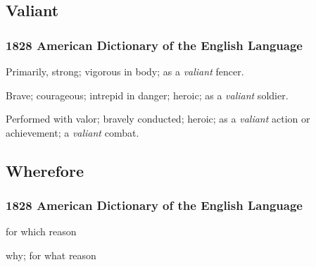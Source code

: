 
	\subsection{Valiant} %
		\label{VALIANT}
		
		\subsubsection{1828 American Dictionary of the English Language}
		
			\begin{compactitem}
				\item[1] Primarily, strong; vigorous in body; as a \textit{valiant} fencer.
				\item[2] Brave; courageous; intrepid in danger; heroic; as a \textit{valiant} soldier.
				\item[3] Performed with valor; bravely conducted; heroic; as a \textit{valiant} action or achievement; a \textit{valiant} combat.
			\end{compactitem}


	\subsection{Wherefore} %
		\label{WHEREFORE}
		
		\subsubsection{1828 American Dictionary of the English Language}

			\begin{compactitem}
				\item[1] for which reason
				\item[2] why; for what reason
			\end{compactitem}

